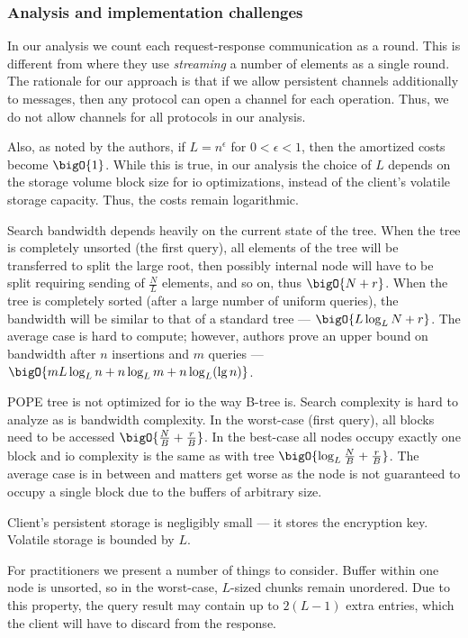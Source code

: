 	\subsubsection{Analysis and implementation challenges}

		In our analysis we count each request-response communication as a round.
		This is different from \cite{pope} where they use \emph{streaming} a number of elements as a single round. %
		The rationale for our approach is that if we allow persistent channels additionally to messages, then any protocol can open a channel for each operation.
		Thus, we do not allow channels for all protocols in our analysis.

		Also, as noted by the authors, if $L = n^{\epsilon}$ for $0 < \epsilon < 1$, then the amortized costs become $\bigO{1}$.
		While this is true, in our analysis the choice of $L$ depends on the storage volume block size for \acrshort{io} optimizations, instead of the client's volatile storage capacity.
		Thus, the costs remain logarithmic.

		Search bandwidth depends heavily on the current state of the tree.
		When the tree is completely unsorted (the first query), all elements of the tree will be transferred to split the large root, then possibly internal node will have to be split requiring sending of $\frac{N}{L}$ elements, and so on, thus $\bigO{N + r}$.
		When the tree is completely sorted (after a large number of uniform queries), the bandwidth will be similar to that of a standard {\BPlus} tree --- $\bigO{L \log_L N + r}$.
		The average case is hard to compute; however, authors prove an upper bound on bandwidth after $n$ insertions and $m$ queries --- $\bigO{m L \log_L n + n \log_L m + n \log_L (\lg n) }$.

		POPE tree is not optimized for \acrshort{io} the way B-tree is.
		Search complexity is hard to analyze as is bandwidth complexity.
		In the worst-case (first query), all blocks need to be accessed $\bigO{\frac{N}{B} + \frac{r}{B}}$.
		In the best-case all nodes occupy exactly one block and \acrshort{io} complexity is the same as with {\BPlus} tree $\bigO{\log_L \frac{N}{B} + \frac{r}{B}}$.
		The average case is in between and matters get worse as the node is not guaranteed to occupy a single block due to the buffers of arbitrary size.

		Client's persistent storage is negligibly small --- it stores the encryption key.
		Volatile storage is bounded by $L$.

		For practitioners we present a number of things to consider.
		Buffer within one node is unsorted, so in the worst-case, $L$-sized chunks remain unordered.
		Due to this property, the query result may contain up to $2 (L - 1)$ extra entries, which the client will have to discard from the response.

